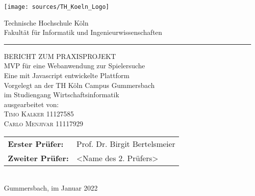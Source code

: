 \documentclass[a4paper,12pt,oneside]{article}
\begin{document}
\pagestyle{empty} %
\newpage %

\pagestyle{empty}
\begin{titlepage}
  \texttt{[image: sources/TH\_Koeln\_Logo]}\\
  \begin{center}
    \Large
    Technische Hochschule Köln\\
    Fakultät für Informatik und Ingenieurwissenschaften\\
    \hrule\par\rule{0pt}{2cm}
    \LARGE
    \textsc{BERICHT ZUM PRAXISPROJEKT}\\
    \vspace{0.8cm}
    \huge
    MVP für eine Webanwendung zur Spielersuche\\ 
    \Large
    Eine mit Javascript entwickelte Plattform \\
    \vspace{0.8cm}
    \large
    Vorgelegt an der TH Köln Campus Gummersbach\\
    im Studiengang Wirtschaftsinformatik\\
    \vspace{0.8cm}
    ausgearbeitet von:\\
    \textsc{Timo Kalker} 11127585\\
    \textsc{Carlo Menjivar} 11117929\\
    \vspace{1cm}
    \begin{tabular}{ll} %
      \textbf{Erster Prüfer:}  & Prof. Dr. Birgit Bertelsmeier \\
      \textbf{Zweiter Prüfer:} & <Name des 2. Prüfers> \\
    \end{tabular}
    \vspace{0.5cm}
    \\Gummersbach, im Januar 2022
  \end{center}
\end{titlepage}


\newpage

\tableofcontents
\pagestyle{fancy} %
\end{document}
